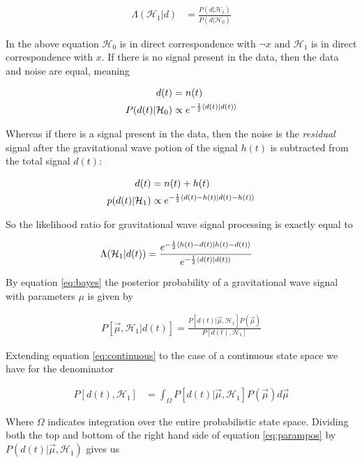 \documentclass[paper=a4, fontsize=11pt]{scrartcl} %
\numberwithin{equation}{section} %
\numberwithin{figure}{section} %
\numberwithin{table}{section} %
\begin{document}
\begin{align}
\Lambda(\mathcal{H}_1|d) &= \frac{P(d|\mathcal{H}_1)}{P(d|\mathcal{H}_0)}
\end{align}

In the above equation $\mathcal{H}_0$ is in direct correspondence with $\neg x$ and $\mathcal{H}_1$ is in direct correspondence with $x$. If there is no signal present in the data, then the data and noise are equal, meaning 

\begin{align}
d(t) &= n(t) \\
P(d(t)|\mathcal{H}_0) &\propto e^{-\frac{1}{2}\braket{d(t)|d(t)}}
\end{align} 

Whereas if there is a signal present in the data, then the noise is the \textit{residual} signal after the gravitational wave potion of the signal $h(t)$ is subtracted from the total signal $d(t)$: 

\begin{align}
d(t) &= n(t) + h(t) \\
p(d(t)|\mathcal{H}_1) &\propto e^{-\frac{1}{2}\braket{d(t) - h(t)|d(t) - h(t)}}
\end{align}

So the likelihood ratio for gravitational wave signal processing is exactly equal to 

\begin{align}
\Lambda(\mathcal{H}_1|d(t)) &= \frac{e^{-\frac{1}{2}\braket{h(t)-d(t)|h(t)-d(t)}}}{e^{-\frac{1}{2}\braket{d(t)|d(t)}}}
\end{align}

By equation \ref{eq:bayes}  the posterior probability of a gravitational wave signal with parameters $\mu$ is given by 

\begin{align}\label{eq:parampos}
P[\vec{\mu}, \mathcal{H}_1|d(t)] = \frac{P[d(t)|\vec{\mu}, \mathcal{H}_1]P(\vec{\mu})}{P[d(t), \mathcal{H}_1]}
\end{align}

Extending equation \ref{eq:continuous} to the case of a continuous state space we have for the denominator

\begin{align}
P[d(t), \mathcal{H}_1] &= \int_{\Omega}P[d(t)|\vec{\mu}, \mathcal{H}_1]P(\vec{\mu})d\vec{\mu}
\end{align}

Where $\Omega$ indicates integration over the entire probabilistic state space. Dividing both the top and bottom of the right hand side of equation \ref{eq:parampos} by $P(d(t)|\vec{\mu}, \mathcal{H}_1)$ gives us 
\end{document}
